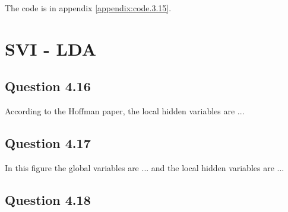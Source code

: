 \documentclass{article}
\begin{document}
The code is in appendix \ref{appendix:code.3.15}.

\section{SVI - LDA}

\subsection*{Question 4.16}

According to the Hoffman paper, the local hidden variables are ...

\subsection*{Question 4.17}

In this figure the global variables are ... and the local hidden variables are ...

\subsection*{Question 4.18}
\end{document}
